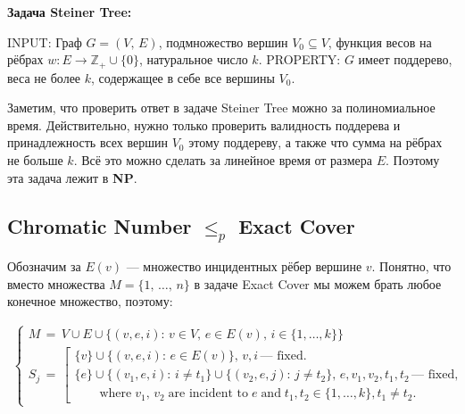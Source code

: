 \documentclass[a4paper,12pt]{article}
\begin{document}
    \noindent\textbf{Задача Steiner Tree:}
    \begin{task}
        INPUT: \; Граф $G = \left(V, \, E\right)$, подмножество вершин $V_0 \subseteq V$, функция весов на рёбрах $w: E \to \mathbb{Z}_+ \cup \{0\}$, натуральное число $k$.\newline
        PROPERTY: \; $G$ имеет поддерево, веса не более $k$, содержащее в себе все вершины $V_0$.
    \end{task}

    \noindent Заметим, что проверить ответ в задаче Steiner Tree можно за полиномиальное время. Действительно, нужно только проверить валидность поддерева и принадлежность всех вершин $V_0$ этому поддереву, а также что сумма на рёбрах не больше $k$. Всё это можно сделать за линейное время от размера $E$. Поэтому эта задача лежит в \textbf{NP}.
    
    \subsection{Chromatic Number \texorpdfstring{$\leqslant_p$}{<=p} Exact Cover}

    Обозначим за $E(v)$ — множество инцидентных рёбер вершине $v$. Понятно, что вместо множества $M = \{1, \, \dots, \, n\}$ в задаче Exact Cover мы можем брать любое конечное множество, поэтому:
    
    \[
        \begin{array}{l}
            \begin{cases}
                M \, = \, V \cup E \cup \{(v, e, i): \, v \in V, \, e \in E(v), \, i \in \{1, \dots, k\}\}\\
                S_j \, = \,
                \left[
                    \begin{array}{l}
                        \{v\} \cup \{(v, e, i): \, e \in E(v)\}, \, v, i \, \text{— fixed}.\\
                        \{e\} \cup \{(v_1, e, i): \, i \neq t_1\} \cup \{(v_2, e, j): \, j \neq t_2\}, \, e, v_1, v_2, t_1, t_2 \, \text{— fixed},\\
                        \hspace{2em}\text{where} \; v_1, \, v_2 \; \text{are incident to} \; e \; \text{and} \; t_1, t_2 \in \{1, \dots, k\}, t_1 \neq t_2.
                    \end{array}
                \right.
            \end{cases}
        \end{array}
    \]
\end{document}

